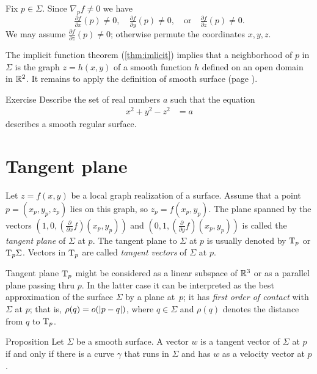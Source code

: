 Fix $p\in\Sigma$.
Since $\nabla_p f\ne 0$ we have 
\[\tfrac{\partial f}{\partial x}(p)\ne 0,\quad \tfrac{\partial f}{\partial y}(p)\ne 0,\quad \text{or}\quad\tfrac{\partial f}{\partial z}(p)\ne 0.\]
We may assume $\tfrac{\partial f}{\partial z}(p)\ne 0$;
otherwise permute the coordinates $x,y,z$.

The implicit function theorem (\ref{thm:imlicit}) implies that a neighborhood of $p$ in $\Sigma$ is the graph $z=h(x,y)$ of a smooth function $h$ defined on an open domain in $\mathbb{R}^2$.
It remains to apply the definition of smooth surface (page \pageref{page:def-smooth-surface}).
\qeds

\begin{thm}{Exercise}\label{ex:hyperboloinds}
Describe the set of real numbers $a$
such that the equation
\begin{align*}
x^2+y^2-z^2&=a
\end{align*}
describes a smooth regular surface.
\end{thm}

\section*{Tangent plane}


Let $z=f(x,y)$ be a local graph realization of a surface. 
Assume that a point $p=(x_p,y_p,z_p)$ lies on this graph, so $z_p=f(x_p,y_p)$.
The plane spanned by the vectors $(1,0,(\tfrac{\partial}{\partial x}f)(x_p,y_p))$ and  $(0,1,(\tfrac{\partial}{\partial y}f)(x_p,y_p))$ is called the \emph{tangent plane} of $\Sigma$ at $p$.
The tangent plane to $\Sigma$ at $p$ is usually denoted by $\mathrm{T}_p$ or $\mathrm{T}_p\Sigma$.
Vectors in $\mathrm{T}_p$ are called \emph{tangent vectors} of $\Sigma$ at $p$. %

Tangent plane $\mathrm{T}_p$ might be considered as a linear subspace of $\mathbb{R}^3$ or as a parallel plane passing thru $p$.
In the latter case it can be interpreted as the best approximation of the surface $\Sigma$ by a plane at~$p$;
it has \emph{first order of contact} with $\Sigma$ at $p$;
that is, $\rho(q)\z=o(|p-q|)$, where $q\in \Sigma$ and $\rho(q)$ denotes the distance from $q$ to $\mathrm{T}_p$. %

\begin{thm}{Proposition}
Let $\Sigma$ be a smooth surface.
A vector $w$ is a tangent vector of $\Sigma$ at $p$ if and only if there is a curve $\gamma$ that runs in $\Sigma$ and has $w$ as a velocity vector at $p$.  
\end{thm}

